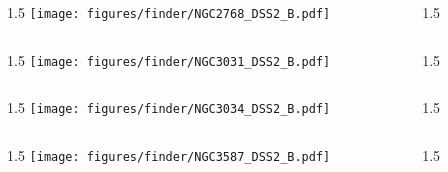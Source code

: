 \documentclass[final]{beamer}
\newlength{\colwidth}
\begin{document}

\begin{frame}[t]{}
  \begin{columns}[T]
    \begin{column}{1.5\colwidth}
      \centering
      \texttt{[image: figures/finder/NGC2768\_DSS2\_B.pdf]}
    \end{column}
    \begin{column}{1.5\colwidth}
      \Large
      
    \end{column}
  \end{columns}
  \vspace{\fill}
  \begin{columns}[T]
    \begin{column}{1.5\colwidth}
      \centering
      \texttt{[image: figures/finder/NGC3031\_DSS2\_B.pdf]}
    \end{column}
    \begin{column}{1.5\colwidth}
      \Large
      
    \end{column}
  \end{columns}
\end{frame}


\begin{frame}[t]{}
  \begin{columns}[T]
    \begin{column}{1.5\colwidth}
      \centering
      \texttt{[image: figures/finder/NGC3034\_DSS2\_B.pdf]}
    \end{column}
    \begin{column}{1.5\colwidth}
      \Large
      
    \end{column}
  \end{columns}
  \vspace{\fill}
  \begin{columns}[T]
    \begin{column}{1.5\colwidth}
      \centering
      \texttt{[image: figures/finder/NGC3587\_DSS2\_B.pdf]}
    \end{column}
    \begin{column}{1.5\colwidth}
      \Large
      
    \end{column}
  \end{columns}
\end{frame}
\end{document}
